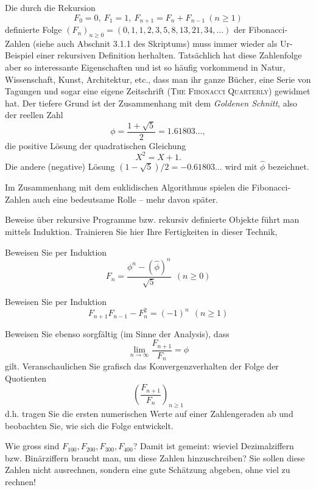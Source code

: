 
Die durch die Rekursion
\[
F_0=0,~ F_1=1,~ F_{n+1}=F_n+F_{n-1}~(n \geq 1)
\]
definierte Folge
$
(F_n)_{n \geq 0} = (0,1,1,2,3,5,8,13,21,34,\ldots)
$
der {\sc Fibonacci}-Zahlen (siehe auch Abschnit 3.1.1 des Skriptums)
muss immer wieder als Ur-Beispiel einer rekursiven Definition herhalten.
Tatsächlich hat diese Zahlenfolge aber so interessante Eigenschaften und ist
so häufig vorkommend in Natur, Wissenschaft, Kunst, Architektur, etc., dass
man ihr ganze Bücher, eine Serie von Tagungen und sogar eine eigene Zeitschrift 
(\textsc {The Fibonacci Quarterly}) gewidmet hat.
Der tiefere Grund ist der Zusammenhang mit dem \textit{Goldenen Schnitt},
also der reellen Zahl
\[
\phi = \frac{1 + \sqrt{5}}{2} = 1.61803\ldots,
\]
die positive Lösung der quadratischen Gleichung
\[
X^2=X+1.
\]
Die andere (negative) Lösung $(1-\sqrt{5})/2 = -0.61803\ldots$ wird mit
$\widehat{\phi}$ bezeichnet.

Im Zusammenhang mit dem euklidischen Algorithmus spielen die
{\sc Fibonacci}-Zahlen auch eine bedeutsame Rolle -- mehr davon später.

Beweise über rekursive Programme bzw. rekursiv definierte Objekte
führt man mittels Induktion. Trainieren Sie hier Ihre Fertigkeiten in dieser Technik,

\begin{flushenum}
\item Beweisen Sie per Induktion
\[
F_n = \frac{\phi^n - (\widehat{\phi})^n}{\sqrt{5}}~~(n \geq 0) 
 \]
\item Beweisen Sie per Induktion
 \[
F_{n+1} F_{n-1} - F_n^2 = (-1)^n~~(n \geq 1)
\]
\item Beweisen Sie ebenso sorgf\"altig (im Sinne der Analysis), dass
\[
\lim_{n \rightarrow \infty} \frac{F_{n+1}}{F_n} = \phi
\] 
gilt. Veranschaulichen Sie grafisch das Konvergenzverhalten der Folge der Quotienten 
\[
\left(\frac{F_{n+1}}{F_n}\right)_{n \geq 1}
\]
d.h. tragen Sie die ersten numerischen Werte auf einer Zahlengeraden ab und beobachten Sie,
wie sich die Folge entwickelt.

\item
Wie gross sind $F_{100}, F_{200}, F_{300}, F_{400}$? Damit ist gemeint: wieviel
Dezimalziffern bzw. Bin\"arziffern braucht man, um diese Zahlen hinzuschreiben?
Sie sollen diese Zahlen nicht ausrechnen, sondern eine gute Sch\"atzung abgeben,
ohne viel zu rechnen!
\end{flushenum}



